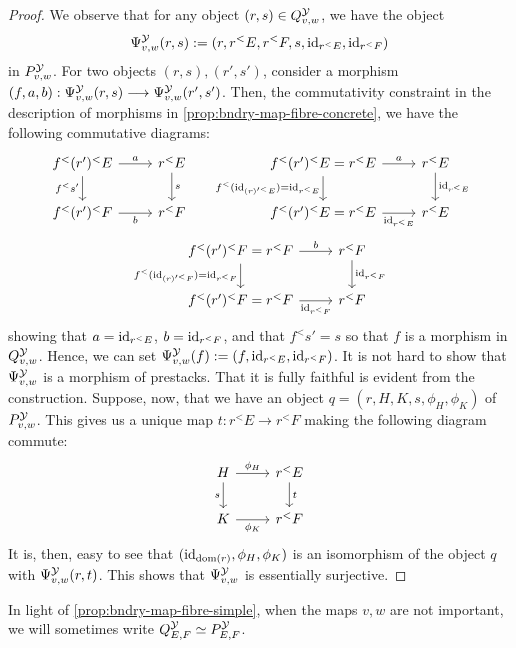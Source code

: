 \documentclass[11pt]{amsart}
\begin{document}
\begin{proof}
We observe that for any object $(r, s) \in Q^\mathcal{Y}_{v, w}$, we have the object
\[
\Psi^\mathcal{Y}_{v, w}(r, s) := (r, r^<E, r^<F, s, \mathrm{id}_{r^<E}, \mathrm{id}_{r^<F})
\]
in $P^\mathcal{Y}_{v, w}$. For two objects $(r, s), (r', s')$, consider
a morphism $(f, a, b) : \Psi^\mcY_{v, w}(r, s) \to \Psi^\mcY_{v, w}(r', s')$.
Then, the commutativity constraint in the description of morphisms
in \cref{prop:bndry-map-fibre-concrete}, we have the following commutative
diagrams:
\[\begin{tikzcd}
f^<(r')^<E \ar[r, "a"] \ar[d, "f^<s'" left] & r^<E \ar[d, "s"] \\
f^<(r')^<F \ar[r, "b" below] & r^<F
\end{tikzcd}\hspace{1.5em}
\begin{tikzcd}
f^<(r')^<E  = r^<E\ar[r, "a"] \ar[d, "f^<(\id_{(r)'^<E}) = \id_{r^<E}" left] &
r^<E \ar[d, "\id_{r^<E}"] \\
f^<(r')^<E = r^<E \ar[r, "\id_{r^<E}" below] &
r^<E
\end{tikzcd}\]\[
\begin{tikzcd}
f^<(r')^<F  = r^<F\ar[r, "b"] \ar[d, "f^<(\id_{(r)'^<F}) = \id_{r^<F}" left] &
r^<F \ar[d, "\id_{r^<F}"] \\
f^<(r')^<F = r^<F \ar[r, "\id_{r^<F}" below] &
r^<F
\end{tikzcd}\]
showing that $a = \mathrm{id}_{r^<E}$, $b= \mathrm{id}_{r^<F}$, and
that $f^<s' = s$ so that $f$ is a morphism in $Q^\mathcal{Y}_{v, w}$. Hence, we can
set $\Psi^\mathcal{Y}_{v, w}(f) := (f, \mathrm{id}_{r^<E}, \mathrm{id}_{r^<F})$. It is not hard to show
that $\Psi^\mathcal{Y}_{v, w}$ is a morphism of prestacks. That it is fully faithful is
evident from the construction. Suppose, now, that we have an object
$q = (r, H, K, s, \phi_H, \phi_K)$ of $P^\mathcal{Y}_{v, w}$. This gives us a unique
map $t : r^<E \to r^<F$ making the following diagram commute:
\[\begin{tikzcd}
H \ar[r, "\phi_H"] \ar[d, "s" left] & r^<E \ar[d, "t"] \\
K \ar[r, "\phi_K" below] & r^<F
\end{tikzcd}\]
It is, then, easy to see that $(\mathrm{id}_{\mathrm{dom}(r)}, \phi_H, \phi_K)$ is an
isomorphism of the object $q$ with $\Psi^\mathcal{Y}_{v, w}(r, t)$. This shows that
$\Psi^\mathcal{Y}_{v, w}$ is essentially surjective.
\end{proof}

\begin{notn}
In light of \cref{prop:bndry-map-fibre-simple},
when the maps $v, w$ are not important, we will sometimes write
$Q^\mathcal{Y}_{E, F} \simeq P^\mathcal{Y}_{E, F}$.
\end{notn}
\end{document}
